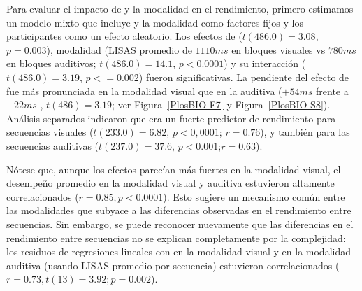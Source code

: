 Para evaluar el impacto de \mdlbin y la modalidad en el rendimiento, primero estimamos un modelo mixto que incluye \mdlbin y la modalidad como factores fijos y los participantes como un efecto aleatorio. Los efectos de \mdlbin ($t (486.0) = 3.08$, $p = 0.003$), modalidad (LISAS promedio de $1110ms$ en bloques visuales vs $780ms$ en bloques auditivos; $t (486.0) = 14.1$, $p < 0.0001$) y su interacción ($t (486.0) = 3.19$, $p< = 0.002$) fueron significativas. La pendiente del efecto de \mdlbin fue más pronunciada en la modalidad visual que en la auditiva ($+54ms$  frente a $+22ms$ , $t (486) = 3.19$; ver Figura~\ref{PlosBIO-F7} y Figura~\ref{PlosBIO-S8}). Análisis separados indicaron que \mdlbin era un fuerte predictor de rendimiento para secuencias visuales ($t (233.0) = 6.82$, $p < 0,0001$; $r = 0.76$), y también para las secuencias auditivas ($t (237.0) = 37.6$, $p < 0.001$;$ r = 0.63$).


Nótese que, aunque los efectos parecían más fuertes en la modalidad visual, el desempeño promedio en la modalidad visual y auditiva estuvieron altamente correlacionados ($r = 0.85, p < 0.0001$). Esto sugiere un mecanismo común entre las modalidades que subyace a las diferencias observadas en el rendimiento entre secuencias. Sin embargo, se puede reconocer nuevamente que las diferencias en el rendimiento entre secuencias no se explican completamente por la complejidad: los residuos de regresiones lineales con \mdlbin en la modalidad visual y en la modalidad auditiva (usando LISAS promedio por secuencia) estuvieron correlacionados ($r = 0.73, t (13) = 3.92; p = 0.002$).


